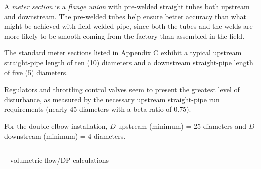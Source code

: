 A {\it meter section} is a {\it flange union} with pre-welded straight tubes both upstream and downstream.  The pre-welded tubes help ensure better accuracy than what might be achieved with field-welded pipe, since both the tubes and the welds are more likely to be smooth coming from the factory than assembled in the field.

\vskip 10pt

The standard meter sections listed in Appendix C exhibit a typical upstream straight-pipe length of ten (10) diameters and a downstream straight-pipe length of five (5) diameters.

\vskip 10pt

Regulators and throttling control valves seem to present the greatest level of disturbance, as measured by the necessary upstream straight-pipe run requirements (nearly 45 diameters with a beta ratio of 0.75).

\vskip 10pt

For the double-elbow installation, $D$ upstream (minimum) = 25 diameters and $D$ downstream (minimum) = 4 diameters.


\filbreak \vskip 5pt \hrule \vskip 5pt  -- volumetric flow/DP calculations \vskip 10pt

